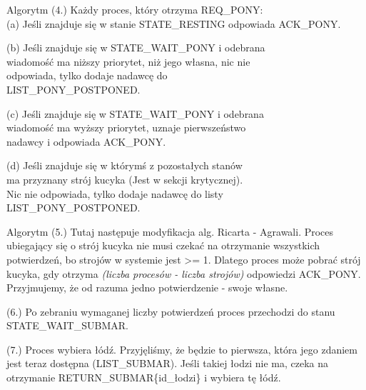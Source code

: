 \documentclass{beamer}
\newcommand\tab[1][1cm]{\hspace*{#1}}
\begin{document}
\begin{frame}{Algorytm}
    \internallinenumbers
    (4.) Każdy proces, który otrzyma REQ\_PONY: \\
        \tab[0.4cm] (a) Jeśli znajduje się w stanie STATE\_RESTING odpowiada
        \tab[1cm] ACK\_PONY.

        \tab[0.4cm] (b) Jeśli znajduje się w STATE\_WAIT\_PONY i odebrana\\
        \tab[1cm] wiadomość ma niższy priorytet, niż jego własna, nic nie\\
        \tab[1cm] odpowiada, tylko dodaje nadawcę do\\
        \tab[1cm] LIST\_PONY\_POSTPONED.
        
        \tab[0.4cm] (c) Jeśli znajduje się w STATE\_WAIT\_PONY i odebrana\\
        \tab[1cm] wiadomość ma wyższy priorytet, uznaje pierwszeństwo  \\
        \tab[1cm] nadawcy i odpowiada ACK\_PONY.

        \tab[0.4cm] (d) Jeśli znajduje się w którymś z pozostałych stanów \\
        \tab[1cm] ma przyznany strój kucyka (Jest w sekcji krytycznej). \\
        \tab[1cm] Nic nie odpowiada, tylko dodaje nadawcę do listy \\
        \tab[1cm] LIST\_PONY\_POSTPONED.
\end{frame}

\begin{frame}{Algorytm}
    \internallinenumbers
    (5.) Tutaj następuje modyfikacja alg. Ricarta - Agrawali. Proces ubiegający się o strój kucyka nie musi czekać na otrzymanie wszystkich potwierdzeń, bo strojów w systemie jest >= 1. Dlatego proces może pobrać strój kucyka, gdy otrzyma \textit{(liczba procesów - liczba strojów)} odpowiedzi ACK\_PONY. Przyjmujemy, że od razuma jedno potwierdzenie - swoje własne.

    \vspace{0.5cm}
    (6.) Po zebraniu wymaganej liczby potwierdzeń proces przechodzi do stanu STATE\_WAIT\_SUBMAR.

    \vspace{0.5cm}
    (7.) Proces wybiera łódź. Przyjęliśmy, że będzie to pierwsza, która jego zdaniem jest teraz dostępna (LIST\_SUBMAR). Jeśli takiej łodzi nie ma, czeka na otrzymanie RETURN\_SUBMAR\{id\_łodzi\} i wybiera tę łódź.
\end{frame}
\end{document}
